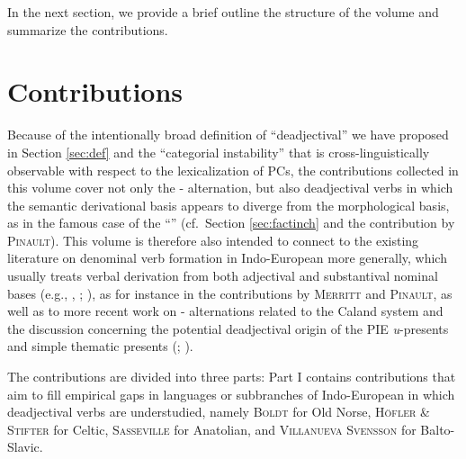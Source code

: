 \documentclass[output=paper,colorlinks,citecolor=brown]{langscibook}
\begin{document}
In the next section, we provide a brief outline the structure of the volume and summarize the contributions.

\section{Contributions}
\label{sec:contr}

Because of the intentionally broad definition of ``deadjectival''   we have proposed in Section \ref{sec:def} and the ``categorial instability'' that is cross-linguistically observable with respect to the lexicalization of PCs, the contributions collected in this volume cover not only the - alternation, but also deadjectival verbs in which the semantic derivational basis appears to diverge from the morphological basis, as in the famous case of the  ``'' (cf.\ Section \ref{sec:factinch} and the contribution by \textsc{Pinault}). This volume is therefore also intended to connect to the existing literature on denominal verb formation in Indo-European more generally, which usually treats verbal derivation from both adjectival and substantival nominal bases (e.g., \citealt{Tucker1988}, \citeyear{Tucker1990}; \citealt{Insler1997}), as for instance in the contributions by \textsc{Merritt} and \textsc{Pinault},  as well as to more recent work on - alternations related to the Caland system   and the discussion concerning the potential deadjectival origin of the PIE \textit{u}-presents and simple thematic presents  (\citealt{VillanuevaSvensson2021}; \citealt{Jasanoff2023}). 


The contributions  are divided into three parts: Part I contains contributions that aim to fill empirical gaps in  languages or subbranches of Indo-European in which deadjectival verbs are understudied, namely \textsc{Boldt} for Old Norse, \textsc{H\"ofler} \& \textsc{Stifter} for Celtic, \textsc{Sasseville}  for Anatolian, and \textsc{Villanueva Svensson} for Balto-Slavic.
\end{document}
